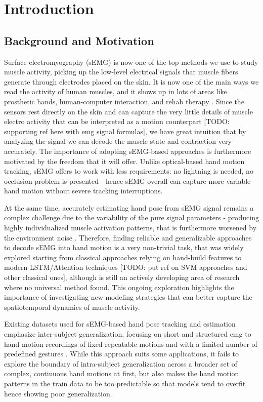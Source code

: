 \chapter{Introduction}
\label{chap:intro}

\section{Background and Motivation}

Surface electromyography (sEMG) is now one of the top methods we use to study muscle activity, picking up the low-level electrical signals that muscle fibers generate through electrodes placed on the skin. It is now one of the main ways we read the activity of human muscles, and it shows up in lots of areas like prosthetic hands, human-computer interaction, and rehab therapy \cite{zheng2022surface, simao2019review}. Since the sensors rest directly on the skin and can capture the very little details of muscle electro activity that can be interpreted as a motion counterpart [TODO: supporting ref here with emg signal formulas], we have great intuition that by analyzing the signal we can decode the muscle state and contraction very accurately. The importance of adopting sEMG-based approaches is furthermore motivated by the freedom that it will offer. Unlike optical-based hand motion tracking, sEMG offers to work with less requirements: no lightning is needed, no occlusion problem is presented - hence sEMG overall can capture more variable hand motion without severe tracking interruptions.

At the same time, accurately estimating hand pose from sEMG signal remains a complex challenge due to the variability of the pure signal parameters - producing highly individualized muscle activation patterns, that is furthermore worsened by the environment noise \cite{farago2022review, zia2018multiday}. Therefore, finding reliable and generalizable approaches to decode sEMG into hand motion is a very non-trivial task, that was widely explored starting from classical approaches relying on hand-build features to modern LSTM/Attention techniques [TODO: put ref on SVM approaches and other classical ones], although is still an actively developing area of research where no universal method found. This ongoing exploration highlights the importance of investigating new modeling strategies that can better capture the spatiotemporal dynamics of muscle activity.

Existing datasets used for sEMG-based hand pose tracking and estimation emphasize inter-subject generalization, focusing on short and structured emg to hand motion recordings of fixed repeatable motions and with a limited number of predefined gestures \cite{salter2024emg2pose}. While this approach suits some applications, it fails to explore the boundary of intra-subject generalization across a broader set of complex, continuous hand motions at first, but also makes the hand motion patterns in the train data to be too predictable so that models tend to overfit hence showing poor generalization.

